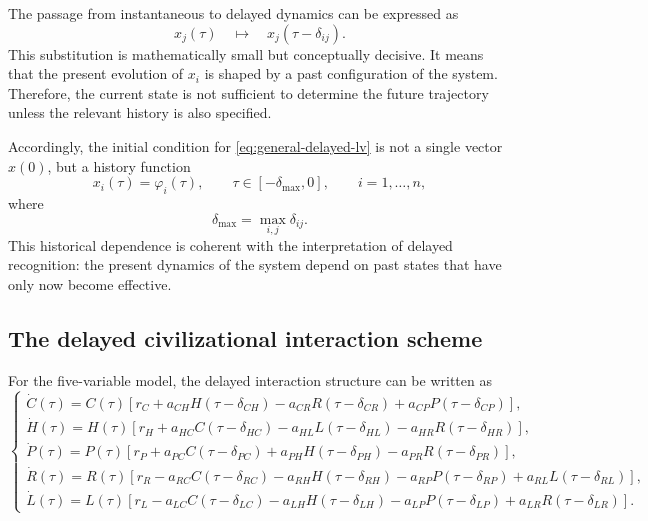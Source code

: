 \documentclass[11pt]{article}
\begin{document}
The passage from instantaneous to delayed dynamics can be expressed as
\begin{equation}
x_j(\tau)
\quad\longmapsto\quad
x_j(\tau-\delta_{ij}).
\label{eq:delay-substitution}
\end{equation}
This substitution is mathematically small but conceptually decisive. It means
that the present evolution of $x_i$ is shaped by a past configuration of the
system. Therefore, the current state is not sufficient to determine the future
trajectory unless the relevant history is also specified.

Accordingly, the initial condition for \eqref{eq:general-delayed-lv} is not a
single vector $x(0)$, but a history function
\begin{equation}
x_i(\tau)=\varphi_i(\tau),
\qquad
\tau\in[-\delta_{\max},0],
\qquad
i=1,\ldots,n,
\label{eq:history-function}
\end{equation}
where
\[
\delta_{\max}=\max_{i,j}\delta_{ij}.
\]
This historical dependence is coherent with the interpretation of delayed
recognition: the present dynamics of the system depend on past states that have
only now become effective.

\subsection{The delayed civilizational interaction scheme}

For the five-variable model, the delayed interaction structure can be written as
\begin{equation}
\begin{cases}
\dot C(\tau)
=
C(\tau)
\left[
r_C
+
a_{CH}H(\tau-\delta_{CH})
-
a_{CR}R(\tau-\delta_{CR})
+
a_{CP}P(\tau-\delta_{CP})
\right],
\\[0.25cm]
\dot H(\tau)
=
H(\tau)
\left[
r_H
+
a_{HC}C(\tau-\delta_{HC})
-
a_{HL}L(\tau-\delta_{HL})
-
a_{HR}R(\tau-\delta_{HR})
\right],
\\[0.25cm]
\dot P(\tau)
=
P(\tau)
\left[
r_P
+
a_{PC}C(\tau-\delta_{PC})
+
a_{PH}H(\tau-\delta_{PH})
-
a_{PR}R(\tau-\delta_{PR})
\right],
\\[0.25cm]
\dot R(\tau)
=
R(\tau)
\left[
r_R
-
a_{RC}C(\tau-\delta_{RC})
-
a_{RH}H(\tau-\delta_{RH})
-
a_{RP}P(\tau-\delta_{RP})
+
a_{RL}L(\tau-\delta_{RL})
\right],
\\[0.25cm]
\dot L(\tau)
=
L(\tau)
\left[
r_L
-
a_{LC}C(\tau-\delta_{LC})
-
a_{LH}H(\tau-\delta_{LH})
-
a_{LP}P(\tau-\delta_{LP})
+
a_{LR}R(\tau-\delta_{LR})
\right].
\end{cases}
\label{eq:five-variable-delayed-system}
\end{equation}
\end{document}
